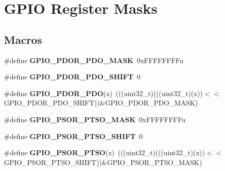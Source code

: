 \hypertarget{group__GPIO__Register__Masks}{}\section{G\+P\+IO Register Masks}
\label{group__GPIO__Register__Masks}
\subsection*{Macros}
\begin{DoxyCompactItemize}
\item 
\#define {\bfseries G\+P\+I\+O\+\_\+\+P\+D\+O\+R\+\_\+\+P\+D\+O\+\_\+\+M\+A\+SK}~0x\+F\+F\+F\+F\+F\+F\+F\+Fu\hypertarget{group__GPIO__Register__Masks_gafd2a8274691295293b3cabfe86089801}{}\label{group__GPIO__Register__Masks_gafd2a8274691295293b3cabfe86089801}

\item 
\#define {\bfseries G\+P\+I\+O\+\_\+\+P\+D\+O\+R\+\_\+\+P\+D\+O\+\_\+\+S\+H\+I\+FT}~0\hypertarget{group__GPIO__Register__Masks_ga495b5f1e63de863534ce0c5f25f137ab}{}\label{group__GPIO__Register__Masks_ga495b5f1e63de863534ce0c5f25f137ab}

\item 
\#define {\bfseries G\+P\+I\+O\+\_\+\+P\+D\+O\+R\+\_\+\+P\+DO}(x)~(((uint32\+\_\+t)(((uint32\+\_\+t)(x))$<$$<$G\+P\+I\+O\+\_\+\+P\+D\+O\+R\+\_\+\+P\+D\+O\+\_\+\+S\+H\+I\+FT))\&G\+P\+I\+O\+\_\+\+P\+D\+O\+R\+\_\+\+P\+D\+O\+\_\+\+M\+A\+SK)\hypertarget{group__GPIO__Register__Masks_ga4071beeff4d9b5c200686972dd52d855}{}\label{group__GPIO__Register__Masks_ga4071beeff4d9b5c200686972dd52d855}

\item 
\#define {\bfseries G\+P\+I\+O\+\_\+\+P\+S\+O\+R\+\_\+\+P\+T\+S\+O\+\_\+\+M\+A\+SK}~0x\+F\+F\+F\+F\+F\+F\+F\+Fu\hypertarget{group__GPIO__Register__Masks_gaa8a48e38ef70ff1ba3bbcbf31b891da4}{}\label{group__GPIO__Register__Masks_gaa8a48e38ef70ff1ba3bbcbf31b891da4}

\item 
\#define {\bfseries G\+P\+I\+O\+\_\+\+P\+S\+O\+R\+\_\+\+P\+T\+S\+O\+\_\+\+S\+H\+I\+FT}~0\hypertarget{group__GPIO__Register__Masks_ga5a962b85e07477e26afe639c7ca478cb}{}\label{group__GPIO__Register__Masks_ga5a962b85e07477e26afe639c7ca478cb}

\item 
\#define {\bfseries G\+P\+I\+O\+\_\+\+P\+S\+O\+R\+\_\+\+P\+T\+SO}(x)~(((uint32\+\_\+t)(((uint32\+\_\+t)(x))$<$$<$G\+P\+I\+O\+\_\+\+P\+S\+O\+R\+\_\+\+P\+T\+S\+O\+\_\+\+S\+H\+I\+FT))\&G\+P\+I\+O\+\_\+\+P\+S\+O\+R\+\_\+\+P\+T\+S\+O\+\_\+\+M\+A\+SK)\hypertarget{group__GPIO__Register__Masks_ga6b16f5841a5c5f20311eafc574f814e4}{}\label{group__GPIO__Register__Masks_ga6b16f5841a5c5f20311eafc574f814e4}


\end{DoxyCompactItemize}
